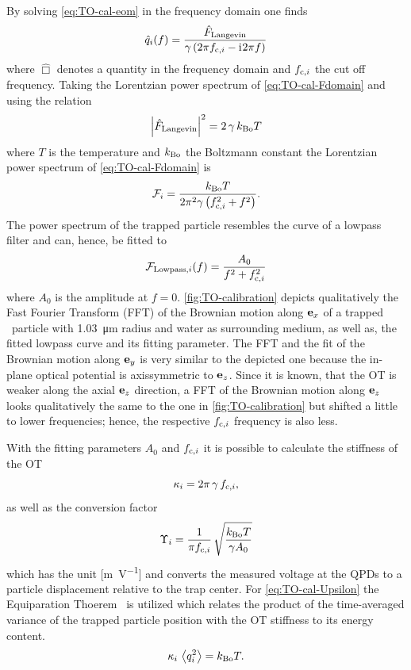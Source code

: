 By solving \cref{eq:TO-cal-eom} in the frequency domain one finds
\begin{equation}
  \hat{q}_{i}(f) = \frac{\hat{F}_{\mathrm{Langevin}}}{\gamma\left( 2\pi f_{\mathrm{c},i} - 
  \mathrm{i}\mkern1mu 2\pi f \right)}
  \label{eq:TO-cal-Fdomain}
\end{equation}
where $\hat{\Box}$ denotes a quantity in the frequency domain and $f_{\mathrm{c},i}$ the 
cut off frequency. Taking the Lorentzian power spectrum of 
\cref{eq:TO-cal-Fdomain} and using the relation
\begin{equation}
  \abs{\hat{F}_{\mathrm{Langevin}}}^{2} = 2\,\gamma\,k_{\mathrm{Bo}}T
\end{equation}
where $T$ is the temperature and $k_{\mathrm{Bo}}$ the Boltzmann constant the 
Lorentzian power spectrum of \cref{eq:TO-cal-Fdomain} is~\cite{Lamprecht2017}
\begin{equation}
  \mathcal{F}_{i}=\frac{k_{\mathrm{Bo}}T}{2\pi^{2}\gamma\left( f_{\mathrm{c},i}^{2}+ f^{2} 
  \right)}.
\end{equation}
The power spectrum of the trapped particle resembles the curve of a lowpass 
filter and can, hence, be fitted to
\begin{equation}
  \mathcal{F}_{\mathrm{Lowpass},i}(f) = \frac{A_{0}}{f^{2} + f_{\mathrm{c},i}^{2}}
\end{equation}
where $A_{0}$ is the amplitude at $f=0$. \cref{fig:TO-calibration} depicts 
qualitatively the Fast Fourier Transform (FFT) of the Brownian motion along 
$\vb{e}_{x}$ of a trapped \SiO~particle with \SI{1.03}{\um} radius and water as 
surrounding medium, as well as, the fitted lowpass curve and its fitting 
parameter. The FFT and the fit of the Brownian motion along $\vb{e}_{y}$ is very 
similar to the depicted one because the in-plane optical potential is 
axissymmetric to $\vb{e}_{z}$. Since it is known, that the OT is weaker along the 
axial $\vb{e}_{z}$ direction, a FFT of the Brownian motion along $\vb{e}_{z}$ looks 
qualitatively the same to the one in \cref{fig:TO-calibration} but shifted a 
little to lower frequencies; hence, the respective $f_{\mathrm{c},i}$ frequency is also 
less.

With the fitting parameters $A_{0}$ and $f_{\mathrm{c},i}$ it is possible to calculate 
the stiffness of the OT~\cite{Lamprecht2017}
\begin{equation}
  \kappa_{i} = 2\pi\,\gamma\,f_{\mathrm{c},i},
\end{equation}
as well as the conversion factor
\begin{equation}
  \Upsilon_{i} = \frac{1}{\pi f_{\mathrm{c},i}}\,
  \sqrt{\frac{k_{\mathrm{Bo}}T}{\gamma A_{0}}}
  \label{eq:TO-cal-Upsilon}
\end{equation}
which has the unit [\si{\meter\per\volt}] and converts the measured voltage at 
the QPDs to a particle displacement relative to the trap center. For 
\cref{eq:TO-cal-Upsilon} the Equiparation Thoerem~\cite{Wang1945} is utilized 
which relates the product of the time-averaged variance of the trapped particle 
position with the OT stiffness to its energy content.
\begin{equation}
  \kappa_{i}\,\left\langle q_{i}^{2} \right\rangle = k_{\mathrm{Bo}}T.
\end{equation}

